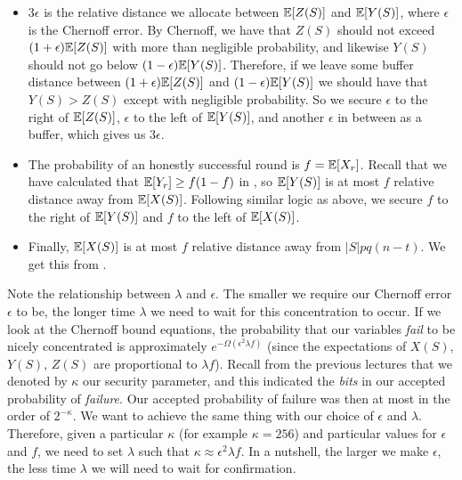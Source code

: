 \begin{itemize}
    \item $3 \epsilon$ is the relative distance we allocate between $\mathbb{E}[Z(S)]$ and $\mathbb{E}[Y(S)]$, where $\epsilon$ is the Chernoff error. By Chernoff, we have that $Z(S)$ should not exceed $(1+\epsilon)\mathbb{E}[Z(S)]$ with more than negligible probability, and likewise $Y(S)$ should not go below $(1-\epsilon)\mathbb{E}[Y(S)]$. Therefore, if we leave some buffer distance between $(1+\epsilon)\mathbb{E}[Z(S)]$ and $(1-\epsilon)\mathbb{E}[Y(S)]$ we should have that $Y(S) > Z(S)$ except with negligible probability. So we secure $\epsilon$ to the right of $\mathbb{E}[Z(S)]$, $\epsilon$ to the left of $\mathbb{E}[Y(S)]$, and another $\epsilon$ in between as a buffer, which gives us $3 \epsilon$.

    \item The probability of an honestly successful round is $f=\mathbb{E}[X_r]$. Recall that we have calculated that $\mathbb{E}[Y_r] \geq f (1-f)$ in , so $\mathbb{E}[Y(S)]$ is at most $f$ relative distance away from $\mathbb{E}[X(S)]$. Following similar logic as above, we secure $f$ to the right of $\mathbb{E}[Y(S)]$ and $f$ to the left of $\mathbb{E}[X(S)]$.

    \item Finally, $\mathbb{E}[X(S)]$ is at most $f$ relative distance away from $|S|pq(n-t)$. We get this from .

\end{itemize}

Note the relationship between $\lambda$ and $\epsilon$. The smaller we require our Chernoff error $\epsilon$ to be, the longer time $\lambda$ we need to wait for this concentration to occur. If we look at the Chernoff bound equations, the probability that our variables \emph{fail} to be nicely concentrated is approximately $e^{-\Omega(\epsilon^2 \lambda f)}$ (since the expectations of $X(S)$, $Y(S)$, $Z(S)$ are proportional to $\lambda f$). Recall from the previous lectures that we denoted by $\kappa$ our security parameter, and this indicated the \emph{bits} in our accepted probability of \emph{failure}. Our accepted probability of failure was then at most in the order of $2^{-\kappa}$. We want to achieve the same thing with our choice of $\epsilon$ and $\lambda$. Therefore, given a particular $\kappa$ (for example $\kappa = 256$) and particular values for $\epsilon$ and $f$, we need to set $\lambda$ such that $\kappa \approx \epsilon^2 \lambda f$. In a nutshell, the larger we make $\epsilon$, the less time $\lambda$ we will need to wait for confirmation.

